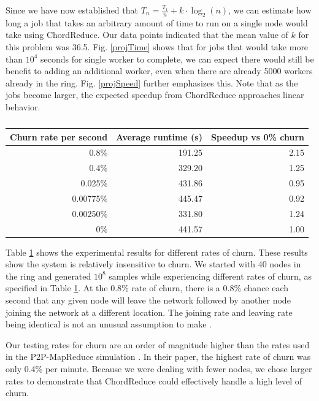 Since we have now established that $T_{n} = \frac{T_{1}}{n} + k \cdot \log_{2}(n)$, we can estimate how long a job that takes an arbitrary amount of time to run on a single node would take using ChordReduce.  Our data points indicated that the mean value of $k$ for this problem was 36.5.  Fig. \ref{projTime} shows that for jobs that would take more than $10^{4}$ seconds for single worker to complete, we can expect there would still be benefit to adding an additional worker, even when there are already 5000 workers already in the ring.  Fig. \ref{projSpeed} further emphasizes this. Note that as the jobs become larger, the expected speedup from ChordReduce  approaches linear behavior.


\begin{table}
    \centering
    \begin{tabular}{|r|r|r|} 
        \hline 
        Churn rate per second & Average runtime (s) & Speedup vs 0\% churn\\ \hline{}
        0.8\% & 191.25 & 2.15 \\ \hline
        0.4\% & 329.20 & 1.25 \\ \hline
        0.025\% & 431.86 & 0.95 \\ \hline 
        0.00775\%  & 445.47 & 0.92 \\ \hline 
        0.00250\% & 331.80  &  1.24 \\ \hline 
        0\% & 441.57 & 1.00 \\ \hline
    \end{tabular}
    \caption{} 
    \label{churnSpeed}
\end{table}


Table \ref{churnSpeed} shows the experimental results for different rates of churn. These results show the system  is relatively insensitive to churn.  We started with 40 nodes in the ring and generated $10^{8}$ samples while experiencing different rates of churn, as specified in Table \ref{churnSpeed}.  At the 0.8\% rate of churn, there is a 0.8\% chance each second that any given node will leave the network followed by another node joining the network at a different location. The joining rate and leaving rate being identical is not an unusual assumption to make \cite{marozzo2012p2p} \cite{load}.  

Our testing rates for churn are an order of magnitude higher than the rates used in the P2P-MapReduce simulation  \cite{marozzo2012p2p}.  In their paper, the highest rate of churn was only 0.4\% per minute. Because we were dealing with fewer nodes, we chose larger rates to demonstrate that ChordReduce could effectively handle a high level of churn.  


